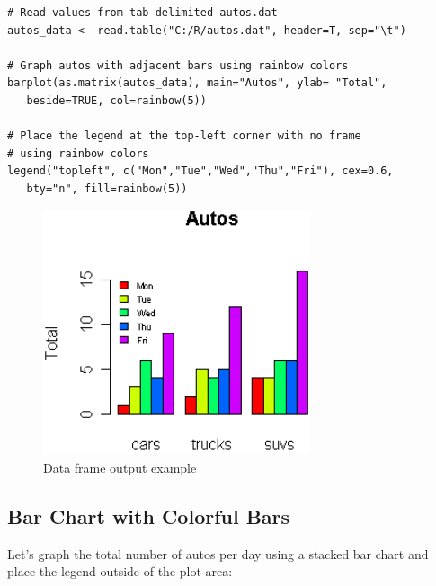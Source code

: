 \documentclass[10pt]{book}
\begin{document}
\begin{lstlisting}
# Read values from tab-delimited autos.dat 
autos_data <- read.table("C:/R/autos.dat", header=T, sep="\t")
   
# Graph autos with adjacent bars using rainbow colors
barplot(as.matrix(autos_data), main="Autos", ylab= "Total",
   beside=TRUE, col=rainbow(5))

# Place the legend at the top-left corner with no frame  
# using rainbow colors
legend("topleft", c("Mon","Tue","Wed","Thu","Fri"), cex=0.6, 
   bty="n", fill=rainbow(5))
\end{lstlisting}
\begin{figure}[H]
    \begin{flushleft}
        \includegraphics[width=0.7\textwidth]{bar_script3.png}
        \caption{Data frame output example}
        \label{fig:dataframe}
    \end{flushleft}
\end{figure}

\subsection*{Bar Chart with Colorful Bars}
Let's graph the total number of autos per day using a stacked bar chart and place the legend outside of the plot area:
\end{document}
